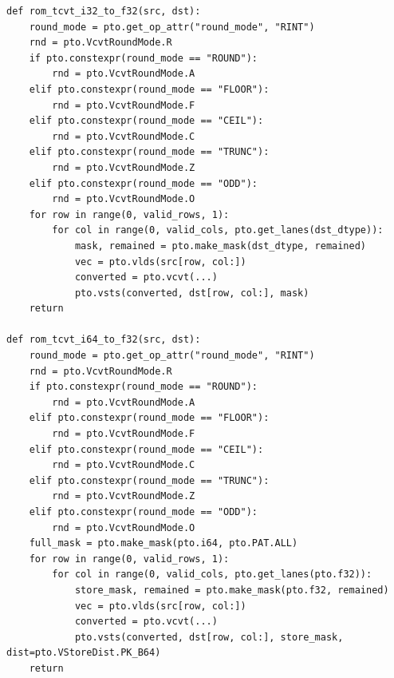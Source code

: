 \begin{lstlisting}[style=ptocode]
def rom_tcvt_i32_to_f32(src, dst):
    round_mode = pto.get_op_attr("round_mode", "RINT")
    rnd = pto.VcvtRoundMode.R
    if pto.constexpr(round_mode == "ROUND"):
        rnd = pto.VcvtRoundMode.A
    elif pto.constexpr(round_mode == "FLOOR"):
        rnd = pto.VcvtRoundMode.F
    elif pto.constexpr(round_mode == "CEIL"):
        rnd = pto.VcvtRoundMode.C
    elif pto.constexpr(round_mode == "TRUNC"):
        rnd = pto.VcvtRoundMode.Z
    elif pto.constexpr(round_mode == "ODD"):
        rnd = pto.VcvtRoundMode.O
    for row in range(0, valid_rows, 1):
        for col in range(0, valid_cols, pto.get_lanes(dst_dtype)):
            mask, remained = pto.make_mask(dst_dtype, remained)
            vec = pto.vlds(src[row, col:])
            converted = pto.vcvt(...)
            pto.vsts(converted, dst[row, col:], mask)
    return

def rom_tcvt_i64_to_f32(src, dst):
    round_mode = pto.get_op_attr("round_mode", "RINT")
    rnd = pto.VcvtRoundMode.R
    if pto.constexpr(round_mode == "ROUND"):
        rnd = pto.VcvtRoundMode.A
    elif pto.constexpr(round_mode == "FLOOR"):
        rnd = pto.VcvtRoundMode.F
    elif pto.constexpr(round_mode == "CEIL"):
        rnd = pto.VcvtRoundMode.C
    elif pto.constexpr(round_mode == "TRUNC"):
        rnd = pto.VcvtRoundMode.Z
    elif pto.constexpr(round_mode == "ODD"):
        rnd = pto.VcvtRoundMode.O
    full_mask = pto.make_mask(pto.i64, pto.PAT.ALL)
    for row in range(0, valid_rows, 1):
        for col in range(0, valid_cols, pto.get_lanes(pto.f32)):
            store_mask, remained = pto.make_mask(pto.f32, remained)
            vec = pto.vlds(src[row, col:])
            converted = pto.vcvt(...)
            pto.vsts(converted, dst[row, col:], store_mask, dist=pto.VStoreDist.PK_B64)
    return
\end{lstlisting}
\Needspace{0.50\textheight}
